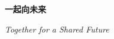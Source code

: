 \documentclass{ctexart}
\begin{document}
    \textbf{一起向未来}

    \emph{Together for a Shared Future}
\end{document}
